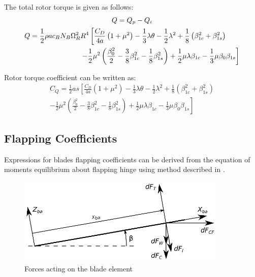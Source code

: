 The total rotor torque is given as follows: \cite{Bramwell2001, NASA-TT-F-494}
\begin{gather}
  Q = Q_p - Q_i \\
  \begin{multlined}[0.88\textwidth]
    Q = \frac{1}{2} \rho a c_B N_B \Omega_R^2 R^4
    \left[
      \frac{C_D}{4a} \left( 1 + \mu^2 \right)
      - \frac{1}{3} \lambda \theta
      - \frac{1}{2} \lambda^2
      + \frac{1}{8} \left( \beta_{1c}^2 + \beta_{1s}^2 \right)
      \right.
      \\
      \left.
      - \frac{1}{2} \mu^2
      \left(
        \frac{\beta_0^2}{2}
        - \frac{3}{8} \beta_{1c}^2
        - \frac{1}{8} \beta_{1s}^2
      \right)
      + \frac{1}{2} \mu \lambda \beta_{1c}
      - \frac{1}{3} \mu \beta_0 \beta_{1s}
    \right]
  \end{multlined}
\end{gather}

Rotor torque coefficient can be written as:
\begin{multline}
  C_Q = \frac{1}{2} a s
  \left[
    \frac{C_D}{4a} \left( 1 + \mu^2 \right)
    - \frac{1}{3} \lambda \theta
    - \frac{1}{2} \lambda^2
    + \frac{1}{8} \left( \beta_{1c}^2 + \beta_{1s}^2 \right)
    \right.
    \\
    \left.
    - \frac{1}{2} \mu^2
    \left(
      \frac{\beta_0^2}{2}
      - \frac{3}{8} \beta_{1c}^2
      - \frac{1}{8} \beta_{1s}^2
    \right)
    + \frac{1}{2} \mu \lambda \beta_{1c}
    - \frac{1}{3} \mu \beta_0 \beta_{1s}
  \right]
\end{multline}

\subsection{Flapping Coefficients}

Expressions for blades flapping coefficients can be derived from the equation of moments equilibrium about flapping hinge using method described in \cite{NASA-TT-F-494}.

\begin{figure}
  \centering
  \includegraphics[width=100mm]{images/blade_element_moments.eps}
  \caption{Forces acting on the blade element}
\end{figure}


